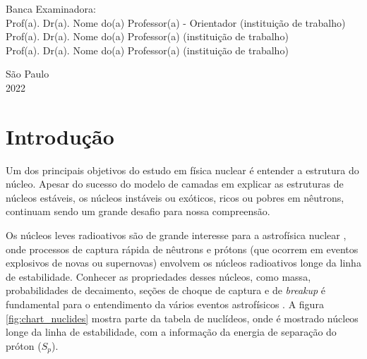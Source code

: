 \documentclass[a4paper,12pt,oneside]{book}
\begin{document}
\par
\leftskip 6cm
\par
\leftskip 0cm
\vskip 2cm


\noindent Banca Examinadora: \\
\noindent Prof(a). Dr(a). Nome do(a) Professor(a) - Orientador (institui\c{c}\~{a}o de trabalho) \\
Prof(a). Dr(a). Nome do(a) Professor(a) (institui\c{c}\~{a}o de trabalho) \\
Prof(a). Dr(a). Nome do(a) Professor(a) (institui\c{c}\~{a}o de trabalho) \\
\vspace{1.8cm}


\begin{center}
    {S\~ao Paulo \\  2022}
\end{center}%
    
\clearpage

\tableofcontents
\listoffigures
\listoftables
\listofalgorithms
\newpage

\chapter{Introdução}


\par Um dos principais objetivos do estudo em física nuclear é entender a estrutura do núcleo. Apesar do sucesso do modelo de camadas em explicar as estruturas de núcleos estáveis, os núcleos instáveis ou exóticos, ricos ou pobres em nêutrons, continuam sendo um grande desafio para nossa compreensão.

\par Os núcleos leves radioativos são de grande interesse para a astrofísica nuclear \cite{BARDAYAN2017415}, onde processos de captura rápida de nêutrons e prótons (que ocorrem em eventos explosivos de novas ou supernovas) envolvem os núcleos radioativos longe da linha de estabilidade. Conhecer as propriedades desses núcleos, como massa, probabilidades de decaimento, seções de choque de captura e de \textit{breakup} é fundamental para o entendimento da vários eventos astrofísicos \cite{BARDAYAN2017415, abud_mater}. A figura \ref{fig:chart_nuclides} mostra parte da tabela de nuclídeos, onde é mostrado núcleos longe da linha de estabilidade, com a informação da energia de separação do próton ($S_p$).
\end{document}
